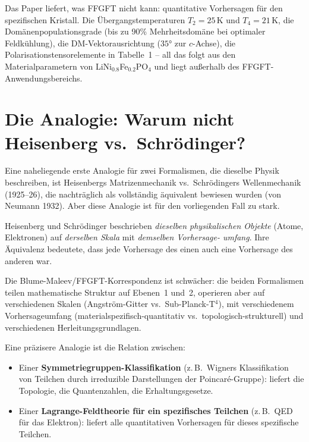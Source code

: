 Das Paper liefert, was FFGFT nicht kann: quantitative Vorhersagen für den
spezifischen Kristall. Die Übergangstemperaturen $T_2 = 25$\,K und
$T_4 = 21$\,K, die Domänenpopulationsgrade (bis zu 90\% Mehrheitsdomäne bei
optimaler Feldkühlung), die DM-Vektorausrichtung ($35°$ zur $c$-Achse), die
Polarisationstensorelemente in Tabelle~1 -- all das folgt aus den
Materialparametern von LiNi$_{0.8}$Fe$_{0.2}$PO$_4$ und liegt außerhalb des
FFGFT-Anwendungsbereichs.

\section{Die Analogie: Warum nicht Heisenberg vs.\ Schrödinger?}

Eine naheliegende erste Analogie für zwei Formalismen, die dieselbe Physik
beschreiben, ist Heisenbergs Matrizenmechanik vs.\ Schrödingers
Wellenmechanik (1925--26), die nachträglich als vollständig äquivalent
bewiesen wurden (von Neumann 1932). Aber diese Analogie ist für den
vorliegenden Fall zu stark.

Heisenberg und Schrödinger beschrieben \emph{dieselben physikalischen Objekte}
(Atome, Elektronen) auf \emph{derselben Skala} mit \emph{demselben Vorhersage-
umfang}. Ihre Äquivalenz bedeutete, dass jede Vorhersage des einen auch eine
Vorhersage des anderen war.

Die Blume-Maleev/FFGFT-Korrespondenz ist schwächer: die beiden Formalismen
teilen mathematische Struktur auf Ebenen~1 und~2, operieren aber auf
verschiedenen Skalen (Angström-Gitter vs.\ Sub-Planck-T$^4$), mit
verschiedenem Vorhersageumfang (materialspezifisch-quantitativ vs.\
topologisch-strukturell) und verschiedenen Herleitungsgrundlagen.

Eine präzisere Analogie ist die Relation zwischen:
\begin{itemize}
  \item Einer \textbf{Symmetriegruppen-Klassifikation} (z.\,B.\ Wigners
        Klassifikation von Teilchen durch irreduzible Darstellungen der
        Poincaré-Gruppe): liefert die Topologie, die Quantenzahlen, die
        Erhaltungsgesetze.
  \item Einer \textbf{Lagrange-Feldtheorie für ein spezifisches Teilchen}
        (z.\,B.\ QED für das Elektron): liefert alle quantitativen Vorhersagen
        für dieses spezifische Teilchen.
\end{itemize}

